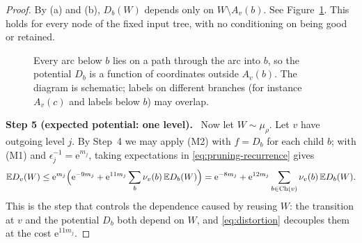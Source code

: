 \documentclass[11pt]{article}
\numberwithin{equation}{section}
\newcommand{\EE}{\mathbb E}
\newcommand{\ch}{\operatorname{Ch}}
\newcommand{\ee}{\mathrm e}
\newcommand{\step}[2]{\par\medskip\noindent\textbf{Step #1 (#2).}\ }
\begin{document}
\begin{proof}
By (a) and (b), $D_b(W)$ depends only on $W\setminus A_v(b)$. See
Figure~\ref{fig:outside}. This holds for every node of the fixed input
tree, with no conditioning on being good or retained.

\begin{figure}[!ht]
\centering
{}
\caption{Every arc below $b$ lies on a path through the arc into $b$,
so the potential $D_b$ is a function of coordinates outside
$A_v(b)$. The diagram is schematic; labels on different branches (for
instance $A_v(c)$ and labels below $b$) may overlap.}
\label{fig:outside}
\end{figure}

\step{5}{expected potential: one level}
Now let $W\sim\mu_\rho$. Let $v$ have outgoing level $j$. By Step~4 we
may apply (M2) with $f=D_b$ for each child $b$; with (M1) and
$\epsilon_j^{-1}=\ee^{m_j}$, taking expectations in
\eqref{eq:pruning-recurrence} gives
\begin{equation}\label{eq:expected-potential}
 \EE D_v(W)
 \le\ee^{m_j}\Bigl(\ee^{-9m_j}
    +\ee^{11m_j}\sum_{b}\nu_v(b)\,\EE D_b(W)\Bigr)
 =\ee^{-8m_j}
    +\ee^{12m_j}\sum_{b\in\ch(v)}\nu_v(b)\,\EE D_b(W).
\end{equation}
This is the step that controls the dependence caused by reusing $W$:
the transition at $v$ and the potential $D_b$ both depend on $W$, and
\eqref{eq:distortion} decouples them at the cost $\ee^{11m_j}$.


\end{proof}
\end{document}
